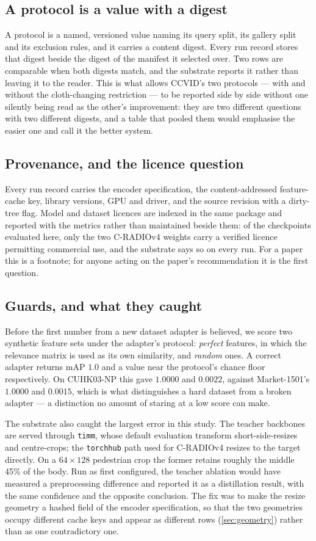 \subsection{A protocol is a value with a digest}
A protocol is a named, versioned value naming its query split, its gallery split and its
exclusion rules, and it carries a content digest. Every run record stores that digest beside
the digest of the manifest it selected over. Two rows are comparable when both digests match,
and the substrate reports it rather than leaving it to the reader. This is what allows
CCVID's two protocols --- with and without the cloth-changing restriction --- to be reported
side by side without one silently being read as the other's improvement: they are two
different questions with two different digests, and a table that pooled them would emphasise
the easier one and call it the better system.

\subsection{Provenance, and the licence question}
Every run record carries the encoder specification, the content-addressed feature-cache key,
library versions, GPU and driver, and the source revision with a dirty-tree flag. Model and
dataset licences are indexed in the same package and reported with the metrics rather than
maintained beside them: of the checkpoints evaluated here, only the two C-RADIOv4 weights
carry a verified licence permitting commercial use, and the substrate says so on every run.
For a paper this is a footnote; for anyone acting on the paper's recommendation it is the
first question.

\subsection{Guards, and what they caught}
Before the first number from a new dataset adapter is believed, we score two synthetic feature
sets under the adapter's protocol: \emph{perfect} features, in which the relevance matrix is
used as its own similarity, and \emph{random} ones. A correct adapter returns mAP $1.0$ and a
value near the protocol's chance floor respectively. On CUHK03-NP this gave $1.0000$ and
$0.0022$, against Market-1501's $1.0000$ and $0.0015$, which is what distinguishes a hard
dataset from a broken adapter --- a distinction no amount of staring at a low score can make.

The substrate also caught the largest error in this study. The teacher backbones are served
through \texttt{timm}, whose default evaluation transform short-side-resizes and centre-crops;
the \texttt{torchhub} path used for C-RADIOv4 resizes to the target directly. On a
$64\times128$ pedestrian crop the former retains roughly the middle 45\% of the
body. Run as first configured, the teacher ablation would have measured a preprocessing
difference and reported it as a distillation result, with the same confidence and the opposite
conclusion. The fix was to make the resize geometry a hashed field of the encoder
specification, so that the two geometries occupy different cache keys and appear as different
rows (\cref{sec:geometry}) rather than as one contradictory one.
